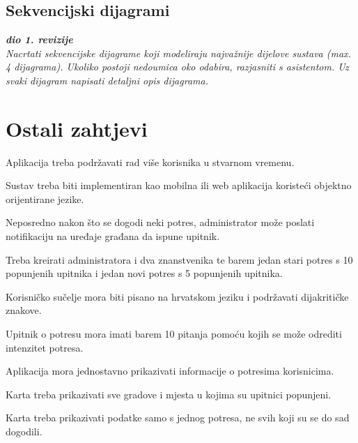 			\subsection{Sekvencijski dijagrami}
				
				\textbf{\textit{dio 1. revizije}}\\
				
				\textit{Nacrtati sekvencijske dijagrame koji modeliraju najvažnije dijelove sustava (max. 4 dijagrama). Ukoliko postoji nedoumica oko odabira, razjasniti s asistentom. Uz svaki dijagram napisati detaljni opis dijagrama.}
				\eject
	
		\section{Ostali zahtjevi}
				\begin{packed_item}
					\item Aplikacija treba podržavati rad više korisnika u stvarnom vremenu.
					\item Sustav treba biti implementiran kao mobilna ili web aplikacija koristeći objektno orijentirane jezike.
					\item Neposredno nakon što se dogodi neki potres, administrator može poslati notifikaciju na uređaje građana da ispune upitnik.
					\item Treba kreirati administratora i dva znanstvenika te barem jedan stari potres s 10 popunjenih upitnika i jedan novi potres s 5 popunjenih upitnika.
					\item Korisničko sučelje mora biti pisano na hrvatskom jeziku i podržavati dijakritičke znakove.
					\item Upitnik o potresu mora imati barem 10 pitanja pomoću kojih se može odrediti intenzitet potresa.
					\item Aplikacija mora jednostavno prikazivati informacije o potresima korisnicima.
					\item Karta treba prikazivati sve gradove i mjesta u kojima su upitnici popunjeni.
					\item Karta treba prikazivati podatke samo s jednog potresa, ne svih koji su se do sad dogodili.
				\end{packed_item}